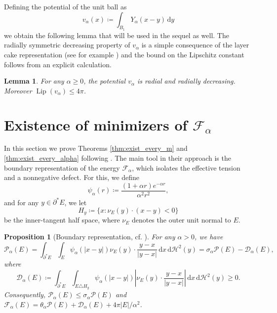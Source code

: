 \documentclass[a4paper,11pt,reqno]{amsart}
\numberwithin{equation}{section}
\newtheorem{proposition}[theorem]{Proposition}
\newtheorem{lemma}[theorem]{Lemma}
\theoremstyle{remark}
\theoremstyle{definition}
\newcommand{\dd}{\,\mathrm{d}}
\newcommand{\defeq}{\coloneqq}
\newcommand{\asymm}[2]{#1\triangle #2}
\newcommand{\enf}{\mathcal{F}_{\alpha}}
\newcommand{\pt}{\partial}
\newcommand{\Htwo}{\mathcal{H}^2}
\renewcommand{\leq}{\leqslant}
\renewcommand{\geq}{\geqslant}
\newcommand{\calD}{\mathcal{D}}
\newcommand{\Pe}{\mathcal{P}}
\DeclareMathOperator{\Lip}{Lip}
\begin{document}
Defining the potential of the unit ball as
	\[
		v_\alpha(x) \defeq \int_{B_1} Y_\alpha(x-y)\dd y
	\]
we obtain the following lemma that will be used in the sequel as well. The radially symmetric decreasing property of $v_\alpha$ is a simple consequence of the layer cake representation (see for example \cite[Theorem 1.13]{LL}) and the bound on the Lipschitz constant follows from an explicit calculation.
	\begin{lemma}\label{lem:potential}
		For any $\alpha\geq 0$, the potential $v_\alpha$ is radial and radially decreasing. Moreover $\Lip(v_\alpha) \leq 4\pi$.
	\end{lemma}


\section{Existence of minimizers of \texorpdfstring{$\enf$}{F\_α}}\label{sec:exist_min_Falpha}

In this section we prove Theorems \ref{thm:exist_every_m} and \ref{thm:exist_every_alpha} following \cite{MNS}. The main tool in their approach is the boundary representation of the energy $\enf$, which isolates the effective tension and a nonnegative defect. For this, we define
	\[
		\psi_\alpha(r) \defeq \frac{(1+\alpha r)e^{-\alpha r}}{\alpha^2 r^2},
	\]
and for any $y\in\pt^* E$, we let
	\[
		H_y \defeq \big\{x \colon \nu_E(y)\cdot (x-y)<0\big\}
	\]
be the inner-tangent half space, where $\nu_E$ denotes the outer unit normal to $E$.

	\begin{proposition}[Boundary representation, cf. {\cite[Lemma 3.1]{MNS}}]\label{prop:bd_repres}
		For any $\alpha>0$, we have
			\[
				\Pe_\alpha(E) = \int_{\pt^* E} \int_{E} \psi_{\alpha}(|x-y|)\nu_E(y)\cdot \frac{y-x}{|y-x|} \dd x \dd \Htwo(y) = \sigma_\alpha \Pe(E) - \calD_\alpha(E),
			\]
		where
			\[
				\calD_\alpha(E) \defeq \int_{\pt^* E} \int_{\asymm{E}{H_y}} \psi_\alpha(|x-y|)\left|\nu_E(y)\cdot \frac{y-x}{|y-x|}\right| \dd x \dd\Htwo(y) \geq 0.
			\]
		Consequently, $\Pe_\alpha(E) \leq \sigma_\alpha \Pe(E)$ and $\enf(E) = \theta_\alpha \Pe(E) + \calD_\alpha(E) + 4\pi|E|/\alpha^2$.
	\end{proposition}
	
\end{document}
